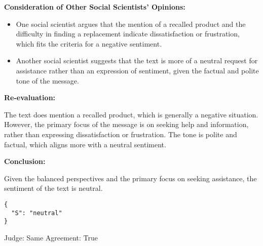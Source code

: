\textbf{Consideration of Other Social Scientists'
Opinions:}

\begin{itemize}
\tightlist
\item
  One social scientist argues that the mention of a recalled product and
  the difficulty in finding a replacement indicate dissatisfaction or
  frustration, which fits the criteria for a negative sentiment.
\item
  Another social scientist suggests that the text is more of a neutral
  request for assistance rather than an expression of sentiment, given
  the factual and polite tone of the message.
\end{itemize}

\textbf{Re-evaluation:}

The text does mention a recalled product, which is generally a negative
situation. However, the primary focus of the message is on seeking help
and information, rather than expressing dissatisfaction or frustration.
The tone is polite and factual, which aligns more with a neutral
sentiment.

\textbf{Conclusion:}

Given the balanced perspectives and the primary focus on seeking
assistance, the sentiment of the text is neutral.

\begin{verbatim}
{
  "S": "neutral"
}
\end{verbatim}

Judge: Same Agreement: True